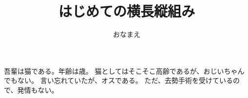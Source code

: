 \documentclass[11pt]{ltjtarticle} %
\title{はじめての横長縦組み}
\author{おなまえ}
\begin{document}
\maketitle

吾輩は猫である。年齢は\hbox{}歳。
猫としてはそこそこ高齢であるが、おじいちゃんでもない。
言い忘れていたが、オスである。
ただ、去勢手術を受けているので、発情もない。
\end{document}
